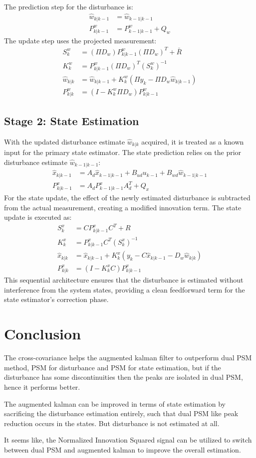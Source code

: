 \documentclass{article}
\begin{document}
The prediction step for the disturbance is:
\begin{align}
    \hat{w}_{k|k-1} &= \hat{w}_{k-1|k-1} \\
    P^w_{k|k-1} &= P^w_{k-1|k-1} + Q_w
\end{align}
The update step uses the projected measurement:
\begin{align}
    S^w_k &= (\Pi D_w) P^w_{k|k-1} (\Pi D_w)^T + \bar{R} \\
    K^w_k &= P^w_{k|k-1} (\Pi D_w)^T (S^w_k)^{-1} \\
    \hat{w}_{k|k} &= \hat{w}_{k|k-1} + K^w_k \left( \Pi y_k - \Pi D_w \hat{w}_{k|k-1} \right) \\
    P^w_{k|k} &= (I - K^w_k \Pi D_w) P^w_{k|k-1}
\end{align}

\subsection{Stage 2: State Estimation}
With the updated disturbance estimate $\hat{w}_{k|k}$ acquired, it is treated as a known input for the primary state estimator. The state prediction relies on the prior disturbance estimate $\hat{w}_{k-1|k-1}$:
\begin{align}
    \hat{x}_{k|k-1} &= A_d \hat{x}_{k-1|k-1} + B_{ud} u_{k-1} + B_{wd} \hat{w}_{k-1|k-1} \\
    P^x_{k|k-1} &= A_d P^x_{k-1|k-1} A_d^T + Q_x
\end{align}
For the state update, the effect of the newly estimated disturbance is subtracted from the actual measurement, creating a modified innovation term. The state update is executed as:
\begin{align}
    S^x_k &= C P^x_{k|k-1} C^T + R \\
    K^x_k &= P^x_{k|k-1} C^T (S^x_k)^{-1} \\
    \hat{x}_{k|k} &= \hat{x}_{k|k-1} + K^x_k \left( y_k - C \hat{x}_{k|k-1} - D_w \hat{w}_{k|k} \right) \\
    P^x_{k|k} &= (I - K^x_k C) P^x_{k|k-1}
\end{align}
This sequential architecture ensures that the disturbance is estimated without interference from the system states, providing a clean feedforward term for the state estimator's correction phase.

\section{Conclusion}
The cross-covariance helps the augmented kalman filter to outperform dual PSM method, PSM for disturbance and PSM for state estimation, but if the disturbance has some discontinuities then the peaks are isolated in dual PSM, hence it performs better.

The augmented kalman can be improved in terms of state estimation by sacrificing the disturbance estimation entirely, such that dual PSM like peak reduction occurs in the states. But disturbance is not estimated at all.

It seems like, the Normalized Innovation Squared signal can be utilized to switch between dual PSM and augmented kalman to improve the overall estimation.
\end{document}

